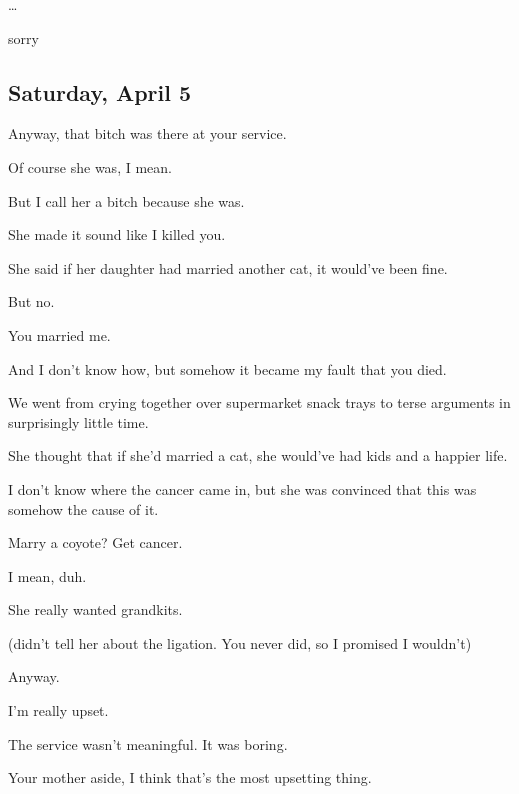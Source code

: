 {
\ldots{}

 sorry

\newpage

\subsection*{Saturday, April 5}\label{saturday-april-5}

 Anyway, that bitch was there at your service.

 Of course she was, I mean.

 But I call her a bitch because she was.

 She made it sound like I killed you.

 She said if her daughter had married another cat, it would've been fine.

 But no.

 You married me.

 And I don't know how, but somehow it became my fault that you died.

 We went from crying together over supermarket snack trays to terse arguments in surprisingly little time.

 She thought that if she'd married a cat, she would've had kids and a happier life.

 I don't know where the cancer came in, but she was convinced that this was somehow the cause of it.

 Marry a coyote? Get cancer.

 I mean, duh.

 She really wanted grandkits.

(didn't tell her about the ligation. You never did, so I promised I wouldn't)

 Anyway.

 I'm really upset.

 The service wasn't meaningful. It was boring.

 Your mother aside, I think that's the most upsetting thing.

}
